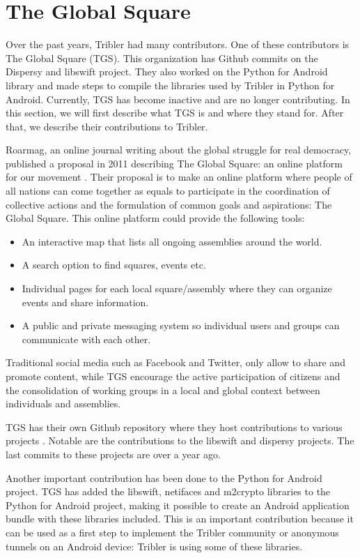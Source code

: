 \section{The Global Square}
	\label{scc:tgs}
	Over the past years, Tribler had many contributors. One of these contributors is The Global Square (TGS). This organization has Github commits on the Dispersy and libswift project. They also worked on the Python for Android library and made steps to compile the libraries used by Tribler in Python for Android. Currently, TGS has become inactive and are no longer contributing. In this section, we will first describe what TGS is and where they stand for. After that, we describe their contributions to Tribler.

	Roarmag, an online journal writing about the global struggle for real democracy, published a proposal in 2011 describing The Global Square: an online platform for our movement \cite{theglobalsquare}. Their proposal is to make an online platform where people of all nations can come together as equals to participate in the coordination of collective actions and the formulation of common goals and aspirations: The Global Square. This online platform could provide the following tools:
	\begin{itemize}
		\item An interactive map that lists all ongoing assemblies around the world.
		\item A search option to find squares, events etc.
		\item Individual pages for each local square/assembly where they can organize events and share information.
		\item A public and private messaging system so individual users and groups can communicate with each other.
	\end{itemize}
	Traditional social media such as Facebook and Twitter, only allow to share and promote content, while TGS encourage the active participation of citizens and the consolidation of working groups in a local and global context between individuals and assemblies.
	
	TGS has their own Github repository where they host contributions to various projects \cite{theglobalsquaregithub}. Notable are the contributions to the libswift and dispersy projects. The last commits to these projects are over a year ago.
		
	Another important contribution has been done to the Python for Android project. TGS has added the libswift, netifaces and m2crypto libraries to the Python for Android project, making it possible to create an Android application bundle with these libraries included. This is an important contribution because it can be used as a first step to implement the Tribler community or anonymous tunnels on an Android device: Tribler is using some of these libraries.

